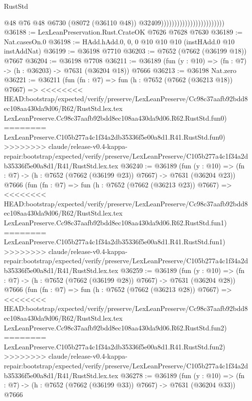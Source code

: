 \begin{lexlean}{RustStd}
\begin{coremodule}
{\begin{coremodule}
{{{{{{{{{{{{{{{{{{{{{{{{{{{{{{{{{{{{{{{{{{{{{{{{{{{{{                                                    @48
                                                    @76
                                                    @48
                                                    @6730
                                                    (@8072 (@36110 @48))
                                                    @32409))))))))))))))))))))))))
@36188 := LexLeanPreservation.Rust.CrateOK @7626 @7628 @7630
@36189 := Nat.casesOn.{0}
@36198 := HAdd.hAdd.{0, 0, 0} @10 @10 @10 (instHAdd.{0} @10 instAddNat)
@36199 := @36198 @7710
@36203 := @7652 (@7662 (@36199 @18)) @7667
@36204 := @36198 @7708
@36211 := @36189 (fun (y : @10) => (fn : @7) -> (h : @36203) -> @7631 (@36204 @18)) @7666
@36213 := @36198 Nat.zero
@36221 := @36211
    (fun (fn : @7) =>
    fun (h : @7652 (@7662 (@36213 @18)) @7667) =>
<<<<<<<< HEAD:bootstrap/expected/verify/preserve/LexLeanPreserve/Cc98c37aafb92bdd8ec108aa430da9d06/R62/RustStd.lex.tex
    LexLeanPreserve.Cc98c37aafb92bdd8ec108aa430da9d06.R62.RustStd.fun0)
========
    LexLeanPreserve.C105b277a4c1f34a2db35336f5e00a8d1.R41.RustStd.fun0)
>>>>>>>> claude/release-v0.4-kappa-repair:bootstrap/expected/verify/preserve/LexLeanPreserve/C105b277a4c1f34a2db35336f5e00a8d1/R41/RustStd.lex.tex
@36240 := @36189
    (fun (y : @10) => (fn : @7) -> (h : @7652 (@7662 (@36199 @23)) @7667) -> @7631 (@36204 @23))
    @7666
    (fun (fn : @7) =>
    fun (h : @7652 (@7662 (@36213 @23)) @7667) =>
<<<<<<<< HEAD:bootstrap/expected/verify/preserve/LexLeanPreserve/Cc98c37aafb92bdd8ec108aa430da9d06/R62/RustStd.lex.tex
    LexLeanPreserve.Cc98c37aafb92bdd8ec108aa430da9d06.R62.RustStd.fun1)
========
    LexLeanPreserve.C105b277a4c1f34a2db35336f5e00a8d1.R41.RustStd.fun1)
>>>>>>>> claude/release-v0.4-kappa-repair:bootstrap/expected/verify/preserve/LexLeanPreserve/C105b277a4c1f34a2db35336f5e00a8d1/R41/RustStd.lex.tex
@36259 := @36189
    (fun (y : @10) => (fn : @7) -> (h : @7652 (@7662 (@36199 @28)) @7667) -> @7631 (@36204 @28))
    @7666
    (fun (fn : @7) =>
    fun (h : @7652 (@7662 (@36213 @28)) @7667) =>
<<<<<<<< HEAD:bootstrap/expected/verify/preserve/LexLeanPreserve/Cc98c37aafb92bdd8ec108aa430da9d06/R62/RustStd.lex.tex
    LexLeanPreserve.Cc98c37aafb92bdd8ec108aa430da9d06.R62.RustStd.fun2)
========
    LexLeanPreserve.C105b277a4c1f34a2db35336f5e00a8d1.R41.RustStd.fun2)
>>>>>>>> claude/release-v0.4-kappa-repair:bootstrap/expected/verify/preserve/LexLeanPreserve/C105b277a4c1f34a2db35336f5e00a8d1/R41/RustStd.lex.tex
@36278 := @36189
    (fun (y : @10) => (fn : @7) -> (h : @7652 (@7662 (@36199 @33)) @7667) -> @7631 (@36204 @33))
    @7666
}}}}}}}}}}}}}}}}}}}}}}}}}}}}}}}}}}}}}}}}}}}}}}}}}}}}}
\end{coremodule}}
\end{coremodule}
\end{lexlean}
